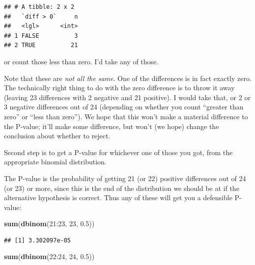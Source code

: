 \documentclass[]{tufte-book}
\newenvironment{Shaded}{}{}
\newcommand{\DecValTok}[1]{\textcolor[rgb]{0.25,0.63,0.44}{#1}}
\newcommand{\FloatTok}[1]{\textcolor[rgb]{0.25,0.63,0.44}{#1}}
\newcommand{\KeywordTok}[1]{\textcolor[rgb]{0.00,0.44,0.13}{\textbf{#1}}}
\newcommand{\NormalTok}[1]{#1}
\newcommand{\OperatorTok}[1]{\textcolor[rgb]{0.40,0.40,0.40}{#1}}
\newcommand{\StringTok}[1]{\textcolor[rgb]{0.25,0.44,0.63}{#1}}
\theoremstyle{definition}
\theoremstyle{definition}
\theoremstyle{definition}
\theoremstyle{remark}
\begin{document}
\begin{Shaded}
\end{Shaded}

\begin{verbatim}
## # A tibble: 2 x 2
##   `diff > 0`     n
##   <lgl>      <int>
## 1 FALSE          3
## 2 TRUE          21
\end{verbatim}

or count those less than zero. I'd take any of those.

Note that these are \emph{not all the same}. One of the differences is
in fact exactly zero. The technically right thing to do with the zero
difference is to throw it away (leaving 23 differences with 2 negative
and 21 positive). I would take that, or 2 or 3 negative differences out
of 24 (depending on whether you count ``greater than zero'' or ``less
than zero''). We hope that this won't make a material difference to the
P-value; it'll make some difference, but won't (we hope) change the
conclusion about whether to reject.

Second step is to get a P-value for whichever one of those you got, from
the appropriate binomial distribution.

The P-value is the probability of getting 21 (or 22) positive
differences out of 24 (or 23) or more, since this is the end of the
distribution we should be at if the alternative hypothesis is correct.
Thus any of these will get you a defensible P-value:

\begin{Shaded}
\begin{Highlighting}[]
\KeywordTok{sum}\NormalTok{(}\KeywordTok{dbinom}\NormalTok{(}\DecValTok{21}\OperatorTok{:}\DecValTok{23}\NormalTok{, }\DecValTok{23}\NormalTok{, }\FloatTok{0.5}\NormalTok{))}
\end{Highlighting}
\end{Shaded}

\begin{verbatim}
## [1] 3.302097e-05
\end{verbatim}

\begin{Shaded}
\begin{Highlighting}[]
\KeywordTok{sum}\NormalTok{(}\KeywordTok{dbinom}\NormalTok{(}\DecValTok{22}\OperatorTok{:}\DecValTok{24}\NormalTok{, }\DecValTok{24}\NormalTok{, }\FloatTok{0.5}\NormalTok{))}
\end{Highlighting}
\end{Shaded}
\end{document}

